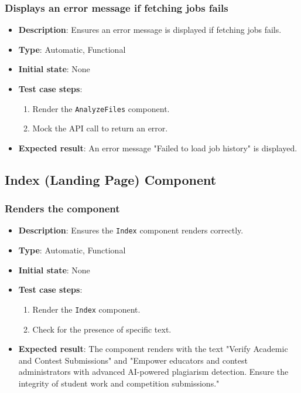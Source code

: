 \documentclass[12pt, titlepage]{article}
\begin{document}
\subsubsection{Displays an error message if fetching jobs fails}
\begin{itemize}
    \item \textbf{Description}: Ensures an error message is displayed if fetching jobs fails.
    \item \textbf{Type}: Automatic, Functional
    \item \textbf{Initial state}: None
    \item \textbf{Test case steps}:
    \begin{enumerate}
        \item Render the \texttt{AnalyzeFiles} component.
        \item Mock the API call to return an error.
    \end{enumerate}
    \item \textbf{Expected result}: An error message "Failed to load job history" is displayed.
    
\end{itemize}


\subsection{Index (Landing Page) Component}

\subsubsection{Renders the component}
\begin{itemize}
    \item \textbf{Description}: Ensures the \texttt{Index} component renders correctly.
    \item \textbf{Type}: Automatic, Functional
    \item \textbf{Initial state}: None
    \item \textbf{Test case steps}:
    \begin{enumerate}
        \item Render the \texttt{Index} component.
        \item Check for the presence of specific text.
    \end{enumerate}
    \item \textbf{Expected result}: The component renders with the text "Verify Academic and Contest Submissions" and "Empower educators and contest administrators with advanced AI-powered plagiarism detection. Ensure the integrity of student work and competition submissions."
\end{itemize}
\end{document}
